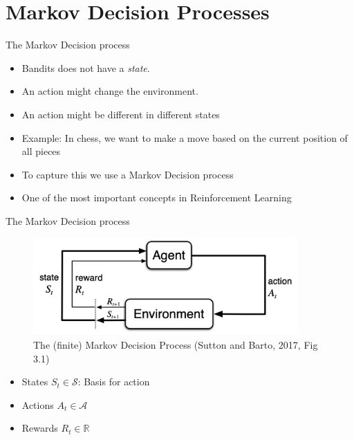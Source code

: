 \documentclass[10pt]{beamer}
\begin{document}
\section{Markov Decision Processes}
\frame{\sectionpage}


\begin{frame}{The Markov Decision process}

\begin{itemize}
\item Bandits does not have a \emph{state}.\pause
\item An action might {\color{uured}change} the environment.
\item An action might be different in different {\color{uured}states}\pause
\item {\color{uured}Example}: In chess, we want to make a move based on the current position of all pieces\pause
\item To capture this we use a {\color{uured}Markov Decision process}
\item One of the most important concepts in Reinforcement Learning
\end{itemize}

\end{frame}





\begin{frame}{The Markov Decision process}

\begin{figure}[h]
\centering
\includegraphics[width=0.9\textwidth]{fig/sutton_fig_3_1.png}
\caption{The (finite) Markov Decision Process (Sutton and Barto, 2017, Fig 3.1)}
\end{figure}

\begin{itemize}
\item States $S_t \in \mathcal{S}$: Basis for action
\item Actions $A_t \in \mathcal{A}$
\item Rewards $R_t \in \mathbb{R}$
\end{itemize}

\end{frame}
\end{document}
